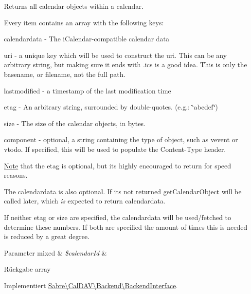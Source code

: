 Returns all calendar objects within a calendar.

Every item contains an array with the following keys\+:
\begin{DoxyItemize}
\item calendardata -\/ The i\+Calendar-\/compatible calendar data
\item uri -\/ a unique key which will be used to construct the uri. This can be any arbitrary string, but making sure it ends with \textquotesingle{}.ics\textquotesingle{} is a good idea. This is only the basename, or filename, not the full path.
\item lastmodified -\/ a timestamp of the last modification time
\item etag -\/ An arbitrary string, surrounded by double-\/quotes. (e.\+g.\+: \textquotesingle{} \char`\"{}abcdef\char`\"{}\textquotesingle{})
\item size -\/ The size of the calendar objects, in bytes.
\item component -\/ optional, a string containing the type of object, such as \textquotesingle{}vevent\textquotesingle{} or \textquotesingle{}vtodo\textquotesingle{}. If specified, this will be used to populate the Content-\/\+Type header.
\end{DoxyItemize}

\mbox{\hyperlink{class_note}{Note}} that the etag is optional, but it\textquotesingle{}s highly encouraged to return for speed reasons.

The calendardata is also optional. If it\textquotesingle{}s not returned \textquotesingle{}get\+Calendar\+Object\textquotesingle{} will be called later, which {\itshape is} expected to return calendardata.

If neither etag or size are specified, the calendardata will be used/fetched to determine these numbers. If both are specified the amount of times this is needed is reduced by a great degree.


\begin{DoxyParams}[1]{Parameter}
mixed & {\em \$calendar\+Id} & \\
\hline
\end{DoxyParams}
\begin{DoxyReturn}{Rückgabe}
array 
\end{DoxyReturn}


Implementiert \mbox{\hyperlink{interface_sabre_1_1_cal_d_a_v_1_1_backend_1_1_backend_interface_aaa786269ba9eb1731fb659b67f684ac2}{Sabre\textbackslash{}\+Cal\+D\+A\+V\textbackslash{}\+Backend\textbackslash{}\+Backend\+Interface}}.



